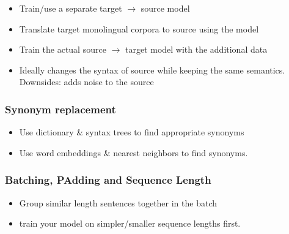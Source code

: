 \documentclass[11pt]{article}
\begin{document}
\begin{itemize}
    \item Train/use a separate target $\rightarrow$ source model
    \item Translate target monolingual corpora to source using the model
    \item Train the actual source $\rightarrow$ target model with the additional data
    \item Ideally changes the syntax of source while keeping the same semantics. Downsides: adds noise to the source
\end{itemize}


\subsubsection{Synonym replacement}

\begin{itemize}
    \item Use dictionary \& syntax trees to find appropriate synonyms
    \item Use word embeddings \& nearest neighbors to find synonyms.
\end{itemize}

\subsubsection{Batching, PAdding and Sequence Length}

\begin{itemize}
    \item Group similar length sentences together in the batch
    \item train your model on simpler/smaller sequence lengths first.
\end{itemize}
\end{document}
